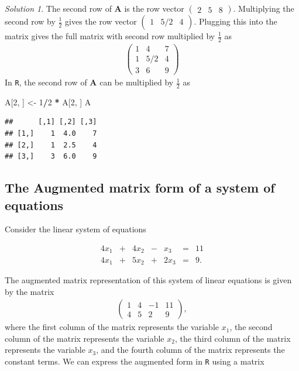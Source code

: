 \documentclass[
]{book}
\newenvironment{Shaded}{\begin{snugshade}}{\end{snugshade}}
\newcommand{\DecValTok}[1]{\textcolor[rgb]{0.00,0.00,0.81}{#1}}
\newcommand{\NormalTok}[1]{#1}
\newcommand{\OperatorTok}[1]{\textcolor[rgb]{0.81,0.36,0.00}{\textbf{#1}}}
\newcommand{\StringTok}[1]{\textcolor[rgb]{0.31,0.60,0.02}{#1}}
\theoremstyle{definition}
\theoremstyle{definition}
\theoremstyle{definition}
\theoremstyle{remark}
\newtheorem*{solution}{Solution}
\begin{document}
\begin{solution}
The second row of \(\mathbf{A}\) is the row vector \(\begin{pmatrix} 2 & 5 & 8 \end{pmatrix}\). Multiplying the second row by \(\frac{1}{2}\) gives the row vector \(\begin{pmatrix} 1 & 5/2 & 4 \end{pmatrix}\). Plugging this into the matrix gives the full matrix with second row multiplied by \(\frac{1}{2}\) as
\[
\begin{aligned}
\begin{pmatrix} 1 & 4 & 7 \\ 1 & 5/2 & 4 \\ 3 & 6 & 9 \end{pmatrix}
\end{aligned}
\]
In \texttt{R}, the second row of \(\mathbf{A}\) can be multiplied by \(\frac{1}{2}\) as

\begin{Shaded}
\begin{Highlighting}[]
\NormalTok{A[}\DecValTok{2}\NormalTok{, ] <-}\StringTok{ }\DecValTok{1}\OperatorTok{/}\DecValTok{2} \OperatorTok{*}\StringTok{ }\NormalTok{A[}\DecValTok{2}\NormalTok{, ]}
\NormalTok{A}
\end{Highlighting}
\end{Shaded}

\begin{verbatim}
##      [,1] [,2] [,3]
## [1,]    1  4.0    7
## [2,]    1  2.5    4
## [3,]    3  6.0    9
\end{verbatim}

\end{solution}

\hypertarget{the-augmented-matrix-form-of-a-system-of-equations}{%
\subsection{The Augmented matrix form of a system of equations}\label{the-augmented-matrix-form-of-a-system-of-equations}}

Consider the linear system of equations

\begin{alignat*}{4}
x_1   & {}+{} & 4 x_2 & {}-{} & x_3 & {}={} & 11 \\
4 x_1 & {}+{} & 5 x_2 & {}+{} & 2 x_3 & {}={} & 9.
\end{alignat*}

The augmented matrix representation of this system of linear equations is given by the matrix
\[
\begin{aligned}
\begin{pmatrix}
1 & 4 & - 1 & 11 \\
4 & 5 & 2   &  9
\end{pmatrix},
\end{aligned}
\]
where the first column of the matrix represents the variable \(x_1\), the second column of the matrix represents the variable \(x_2\), the third column of the matrix represents the variable \(x_3\), and the fourth column of the matrix represents the constant terms. We can express the augmented form in \texttt{R} using a matrix
\end{document}
